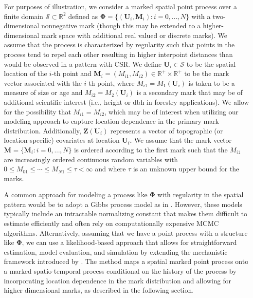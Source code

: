 For purposes of illustration, we consider a marked spatial point process
over a finite domain \(\mathscr{S} \subset \mathbb{R}^2\) defined as
\(\boldsymbol{\Phi} = \{(\boldsymbol{U}_i, \boldsymbol{M}_i): i = 0, \dots, N\}\)
with a two-dimensional nonnegative mark (though this may be extended to
a higher-dimensional mark space with additional real valued or discrete
marks). We assume that the process is characterized by regularity such
that points in the process tend to repel each other resulting in higher
interpoint distances than would be observed in a pattern with CSR. We
define \(\boldsymbol{U}_i \in \mathscr{S}\) to be the spatial location of
the \(i\)-th point and
\(\boldsymbol{M}_i = \left (M_{i1}, M_{i2} \right ) \in \mathbb{R}^{+} \times \mathbb{R}^{+}\)
to be the mark vector associated with the \(i\)-th point, where
\(M_{i1} = M_1(\boldsymbol{U}_i)\) is taken to be a measure of size or age
and \(M_{i2} = M_2(\boldsymbol{U}_i)\) is a secondary mark that may be of
additional scientific interest (i.e., height or dbh in forestry
applications). We allow for the possibility that \(M_{i1} = M_{i2}\),
which may be of interest when utilizing our modeling approach to capture
location dependence in the primary mark distribution. Additionally,
\(\boldsymbol{Z}(\boldsymbol{U}_i)\) represents a vector of topographic
(or location-specific) covariates at location \(\boldsymbol{U}_i\). We
assume that the mark vector
\(\boldsymbol{M}= \{\boldsymbol{M}_i: i = 0, \dots, N\}\) is ordered
according to the first mark such that the \(M_{i1}\) are increasingly
ordered continuous random variables with
\(0 \leq M_{01} \leq \cdots \leq M_{N1} \leq \tau < \infty\) and where
\(\tau\) is an unknown upper bound for the marks.

A common approach for modeling a process like \(\boldsymbol{\Phi}\) with
regularity in the spatial pattern would be to adopt a Gibbs process
model as in \citet{mollerStatisticalInferenceSimulation2003}. However, these
models typically include an intractable normalizing constant that makes
them difficult to estimate efficiently and often rely on computationally
expensive MCMC algorithms. Alternatively, assuming that we have a point
process with a structure like \(\boldsymbol{\Phi}\), we can use a
likelihood-based approach that allows for straightforward estimation,
model evaluation, and simulation by extending the mechanistic framework
introduced by \citet{mollerMechanisticSpatiotemporalPoint2016a}. The method
maps a spatial marked point process onto a marked spatio-temporal
process conditional on the history of the process by incorporating
location dependence in the mark distribution and allowing for higher
dimensional marks, as described in the following section.

